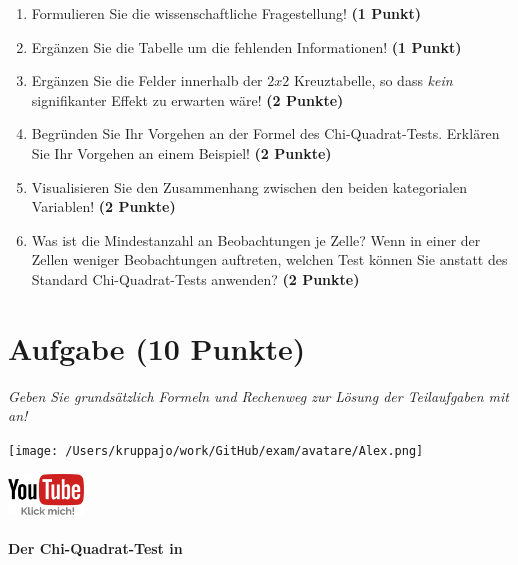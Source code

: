 \documentclass[a4paper, 9pt]{scrartcl}\usepackage[]{graphicx}\usepackage[]{xcolor}
\begin{document}
\begin{enumerate}
  \item Formulieren Sie die wissenschaftliche Fragestellung! \textbf{(1 Punkt)}
\item Ergänzen Sie die Tabelle um die fehlenden Informationen! \textbf{(1 Punkt)} 
\item Ergänzen Sie die Felder innerhalb der $2x2$ Kreuztabelle, so dass \textit{kein} signifikanter Effekt zu erwarten wäre! \textbf{(2 Punkte)}
\item Begründen Sie Ihr Vorgehen an der Formel des Chi-Quadrat-Tests. Erklären Sie Ihr Vorgehen an einem Beispiel! \textbf{(2 Punkte)}
\item Visualisieren Sie den Zusammenhang zwischen den beiden kategorialen Variablen! \textbf{(2 Punkte)}
\item Was ist die Mindestanzahl an Beobachtungen je Zelle? Wenn in einer der Zellen weniger Beobachtungen auftreten, welchen Test können Sie anstatt des Standard Chi-Quadrat-Tests anwenden? \textbf{(2 Punkte)}
\end{enumerate} 
\clearpage

\section{Aufgabe \hfill (10 Punkte)}

\textit{Geben Sie grundsätzlich Formeln und Rechenweg zur Lösung der Teilaufgaben mit an!} \\[1Ex]
 

 
\begin{minipage}[t]{0.5\textwidth}
\texttt{[image: /Users/kruppajo/work/GitHub/exam/avatare/Alex.png]}
\end{minipage}
\begin{minipage}[t]{0.5\textwidth}
\hfill
\href{https://youtu.be/ghArbetOr_E}{\includegraphics[width = 2cm]{img/youtube}}
\end{minipage}
\vspace{-3Ex}



\paragraph{Der Chi-Quadrat-Test in \Rlogo}
\end{document}
